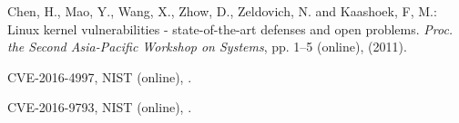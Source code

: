 \documentclass[english,sigrecommended,JIP]{ipsj}
\begin{document}
\begin{thebibliography}{99}

    Chen, H., Mao, Y., Wang, X., Zhow, D., Zeldovich, N. and Kaashoek, F, M.: Linux kernel vulnerabilities - state-of-the-art defenses and open problems. \textit{Proc. the Second Asia-Pacific Workshop on Systems}, pp. 1--5 (online),  (2011).


  CVE-2016-4997, NIST (online),  .
  
  CVE-2016-9793, NIST (online),   .


\end{thebibliography}
\end{document}

